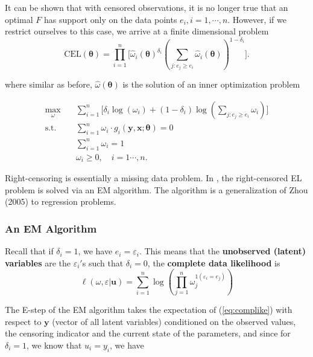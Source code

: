 \documentclass[article]{jss}
\renewcommand{\|}{\,|\,}
\begin{document}
It can be shown that with censored observations, it is no longer true that an optimal \(F\) has support only on the data points \(e_i, i=1,\cdots,n\). However, if we restrict ourselves to this case, we arrive at a finite dimensional problem
\begin{equation} \label{eq:elcens}
  \textrm{CEL}(\bm \theta) = \prod_{i=1}^n \Big[\hat \omega_i(\bm \theta)^{\delta_i}(\sum_{j: e_j \geq e_i}\hat \omega_i(\bm \theta))^{1-\delta_i}\Big].
\end{equation}

where similar as before, \(\hat\omega(\bm \theta)\) is the solution of an inner optimization problem

\begin{equation} \label{eq:elcens_inner}
\begin{split}
  \max_{\omega}\quad & \sum_{i=1}^n \Big[\delta_i\log(\omega_i) + (1-\delta_i)\log(\sum_{j: e_j\geq e_i}\omega_i)\Big]\\
  \text{s.t.}\quad & \sum_{i=1}^n \omega_i\cdot g_i(\bm y,\bm x;\bm \theta) = 0 \\
  & \sum_{i=1}^n \omega_i = 1 \\
  & \omega_i \geq 0, \quad i=1\cdots,n.
\end{split}
\end{equation}

Right-censoring is essentially a missing data problem. In , the right-censored EL problem is solved via an EM algorithm. The algorithm is a generalization of Zhou (2005) to regression problems.

\hypertarget{an-em-algorithm}{%
\subsubsection{An EM Algorithm}\label{an-em-algorithm}}

Recall that if \(\delta_i=1\), we have \(e_i=\varepsilon_i\). This means that the \textbf{unobserved (latent) variables} are the \(\varepsilon_i'\)s such that \(\delta_i = 0\), the \textbf{complete data likelihood} is
\begin{equation}\label{eq:complike}
  \ell(\omega,\varepsilon|\bm u) = \sum_{i=1}^n\log(\prod_{j=1}^n \omega_j^{\mathfrak 1(\varepsilon_i=e_j)})
\end{equation}

The E-step of the EM algorithm takes the expectation of (\ref{eq:complike}) with respect to \(\bm y\) (vector of all latent variables) conditioned on the observed values, the censoring indicator and the current state of the parameters, and since for \(\delta_i = 1\), we know that \(u_i=y_i\), we have
\end{document}
